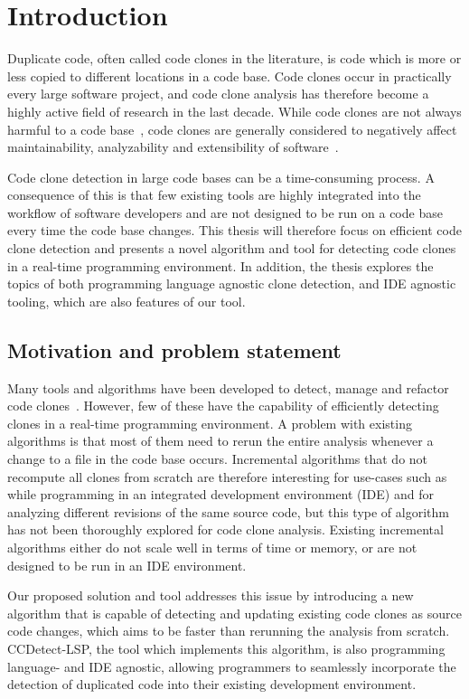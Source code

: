 \chapter{Introduction}

Duplicate code, often called code clones in the literature, is code which is more or less
copied to different locations in a code base. Code clones occur in practically every large
software project, and code clone analysis has therefore become a highly active field of
research in the last decade. While code clones are not always harmful to a code
base~\cite[209]{Inoue_introduction_to_cc}, code clones are generally considered to
negatively affect maintainability, analyzability and extensibility of
software~\cite[22]{Inoue_introduction_to_cc}.

Code clone detection in large code bases can be a time-consuming process. A consequence of
this is that few existing tools are highly integrated into the workflow of software
developers and are not designed to be run on a code base every time the code base changes.
This thesis will therefore focus on efficient code clone detection and presents a novel
algorithm and tool for detecting code clones in a real-time programming environment. In
addition, the thesis explores the topics of both programming language agnostic clone
detection, and IDE agnostic tooling, which are also features of our tool.

\section{Motivation and problem statement}

Many tools and algorithms have been developed to detect, manage and refactor code
clones~\cite[6]{Inoue_introduction_to_cc}. However, few of these have the capability of
efficiently detecting clones in a real-time programming environment. A problem with
existing algorithms is that most of them need to rerun the entire analysis whenever a
change to a file in the code base occurs. Incremental algorithms that do not recompute all
clones from scratch are therefore interesting for use-cases such as while programming in
an integrated development environment (IDE) and for analyzing different revisions of the
same source code, but this type of algorithm has not been thoroughly explored for code
clone analysis. Existing incremental algorithms either do not scale well in terms of time
or memory, or are not designed to be run in an IDE environment.

Our proposed solution and tool addresses this issue by introducing a new algorithm that is
capable of detecting and updating existing code clones as source code changes, which aims
to be faster than rerunning the analysis from scratch. CCDetect-LSP, the tool which
implements this algorithm, is also programming language- and IDE agnostic, allowing
programmers to seamlessly incorporate the detection of duplicated code into their existing
development environment.

